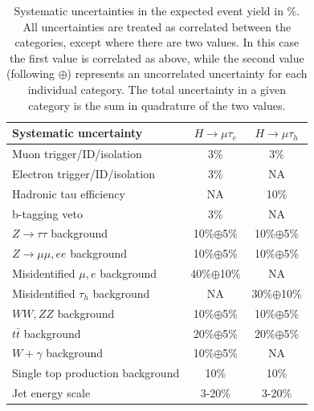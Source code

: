 \documentclass[oneside, letterpaper, oldfontcommands]{memoir}
\begin{document}
\begin{table}[t]
 \centering
  \caption{
Systematic uncertainties in the expected event yield in \%. All uncertainties are treated as correlated between the categories, except where there are two values. In
this case the first value is correlated as above, while the second value (following $\oplus$) represents an uncorrelated uncertainty for each individual category.
The total uncertainty in a given category is the sum in quadrature of the two values.}
  \label{tab:systematics13TeV}
{
\begin{tabular}{l|c|c} \hline
Systematic  uncertainty                                &  $H \rightarrow \mu \tau_{e}$ & $H \rightarrow \mu \tau_{h}$  \\ \hline
Muon  trigger/ID/isolation                             &              3\%           &    3\%   \\
Electron trigger/ID/isolation                          &              3\%           &    NA   \\
Hadronic tau efficiency                                &              NA           &    10\%  \\
b-tagging veto                                         &              3\%           &   NA    \\ \hline  \hline
$Z \rightarrow \tau \tau$ background                        &              10\%$\oplus$5\%          &    10\%$\oplus$5\%  \\
$Z \rightarrow \mu\mu,ee$ background                  &              10\%$\oplus$5\%          &    10\%$\oplus$5\%  \\
Misidentified $\mu,e$  background                   &              40\%$\oplus$10\%          &    NA   \\
Misidentified $\tau_{h}$  background                      &              NA           &    30\%$\oplus$10\%  \\
$WW,ZZ$ background               &              10\%$\oplus$5\%          &    10\%$\oplus$5\%  \\
$t\bar{t}$ background                                    &              20\%$\oplus$5\%          &    20\%$\oplus$5\%  \\
$W +\gamma$ background                               &              10\%$\oplus$5\%          &   NA    \\
Single top production background                       &               10\%         &   10\%   \\ \hline  \hline
Jet energy scale                                       &        3-20\%             &   3-20\% \\

\end{tabular}}
\end{table}
\end{document}
